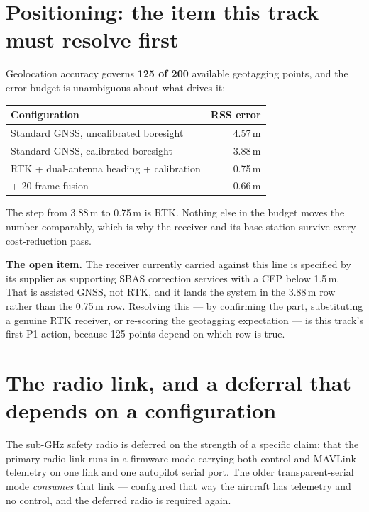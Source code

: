 \documentclass[11pt,a4paper]{article}
\begin{document}
\section{Positioning: the item this track must resolve first}

Geolocation accuracy governs \textbf{125 of 200} available geotagging points, and
the error budget is unambiguous about what drives it:

\begin{center}
\begin{tabular}{@{}lr@{}}
\toprule
\textbf{Configuration} & \textbf{RSS error} \\
\midrule
Standard GNSS, uncalibrated boresight & 4.57\,m \\
Standard GNSS, calibrated boresight & 3.88\,m \\
RTK + dual-antenna heading + calibration & 0.75\,m \\
\quad + 20-frame fusion & 0.66\,m \\
\bottomrule
\end{tabular}
\end{center}

The step from 3.88\,m to 0.75\,m is RTK. Nothing else in the budget moves the
number comparably, which is why the receiver and its base station survive every
cost-reduction pass.

\textbf{The open item.} The receiver currently carried against this line is
specified by its supplier as supporting SBAS correction services with a CEP
below 1.5\,m. That is assisted GNSS, not RTK, and it lands the system in the
3.88\,m row rather than the 0.75\,m row. Resolving this --- by confirming the
part, substituting a genuine RTK receiver, or re-scoring the geotagging
expectation --- is this track's first P1 action, because 125 points depend on
which row is true.

\section{The radio link, and a deferral that depends on a configuration}

The sub-GHz safety radio is deferred on the strength of a specific claim: that
the primary radio link runs in a firmware mode carrying both control and MAVLink
telemetry on one link and one autopilot serial port. The older transparent-serial
mode \emph{consumes} that link --- configured that way the aircraft has telemetry
and no control, and the deferred radio is required again.
\end{document}
